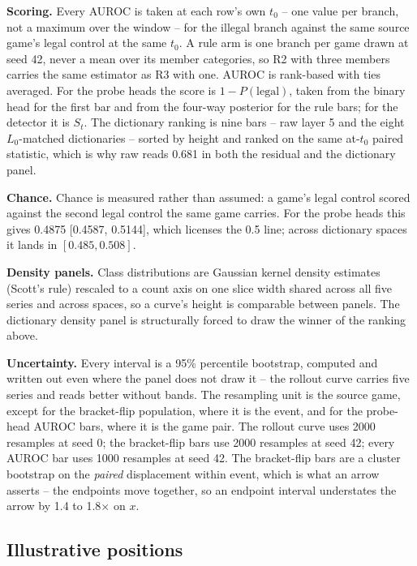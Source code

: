 \documentclass{article}
\begin{document}
\textbf{Scoring.} Every AUROC is taken at each row's own $t_0$ -- one value per branch, not a
maximum over the window -- for the illegal branch against the same source game's legal control at
the same $t_0$. A rule arm is one branch per game drawn at seed 42, never a mean over its member
categories, so R2 with three members carries the same estimator as R3 with one. AUROC is
rank-based with ties averaged. For the probe heads the score is $1 - P(\text{legal})$, taken from
the binary head for the first bar and from the four-way posterior for the rule bars; for the
detector it is $S_t$. The dictionary ranking is nine bars -- raw layer 5 and the eight
$L_0$-matched dictionaries -- sorted by height and ranked on the same at-$t_0$ paired statistic,
which is why raw reads 0.681 in both the residual and the dictionary panel.

\textbf{Chance.} Chance is measured rather than assumed: a game's legal control scored against
the second legal control the same game carries. For the probe heads this gives 0.4875 [0.4587,
0.5144], which licenses the 0.5 line; across dictionary spaces it lands in $[0.485, 0.508]$.

\textbf{Density panels.} Class distributions are Gaussian kernel density estimates (Scott's rule)
rescaled to a count axis on one slice width shared across all five series and across spaces, so a
curve's height is comparable between panels. The dictionary density panel is structurally forced
to draw the winner of the ranking above.

\textbf{Uncertainty.} Every interval is a 95\% percentile bootstrap, computed and written out
even where the panel does not draw it -- the rollout curve carries five series and reads better
without bands. The resampling unit
is the source game, except for the bracket-flip population, where it is the event, and for the
probe-head AUROC bars, where it is the game pair. The rollout curve uses 2000 resamples at seed
0; the bracket-flip bars use 2000 resamples at seed 42; every AUROC bar uses 1000 resamples at
seed 42. The bracket-flip bars are a cluster bootstrap on the \emph{paired} displacement within
event, which is what an arrow asserts -- the endpoints move together, so an endpoint interval
understates the arrow by 1.4 to 1.8$\times$ on $x$.

\subsection{Illustrative positions}
\end{document}
